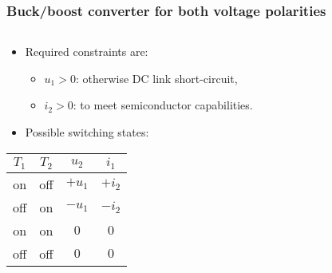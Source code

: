 \begin{frame}
    \frametitle{Buck/boost converter for both voltage polarities}
    \begin{columns}
        \begin{column}{0.45\textwidth}
            \begin{itemize}
                \item Required constraints are: 
                \begin{itemize}
                    \item $u_1>0$: otherwise DC link short-circuit,
                    \item $i_2>0$: to meet semiconductor capabilities. 
                \end{itemize}
                \item<2-> Possible switching states:
            \end{itemize}
        \begin{center}
            \begin{tabular}{c c c c}
                \toprule
                $T_1$ & $T_2$ & $u_2$ & $i_1$\\
                \midrule
                on & off & $+u_1$ & $+i_2$\\
                off & on & $-u_1$ & $-i_2$\\
                on & on & $0$ & $0$\\
                off & off & $0$ & $0$\\
                \bottomrule
            \end{tabular}
        \end{center}
        

\end{column}
\end{columns}
\end{frame}
